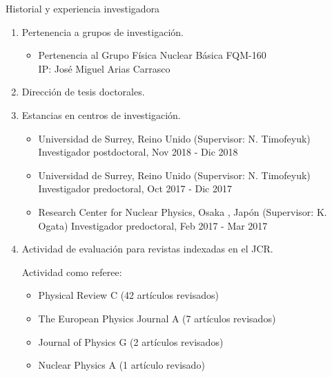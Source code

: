 \documentclass{resume2} %
\begin{document}
\begin{rSection}{Historial y experiencia investigadora}
\begin{enumerate}[label=\alph*.]
\item Pertenencia a grupos de investigación.

\begin{itemize}
\item Pertenencia al Grupo F\'isica Nuclear B\'asica FQM-160 \\
IP: Jos\'e Miguel Arias Carrasco
\end{itemize}

\item Direcci\'on de tesis doctorales.

\item Estancias en centros de investigaci\'on.

\begin{itemize}
\item  Universidad de Surrey, Reino Unido (Supervisor: N. Timofeyuk) \newline Investigador postdoctoral, Nov 2018 - Dic 2018 
\newline\quad{}

\item Universidad de Surrey, Reino Unido (Supervisor: N. Timofeyuk) \newline Investigador predoctoral, Oct 2017 - Dic 2017 
\newline\quad{}

\item  Research Center for Nuclear Physics, Osaka , Jap\'on (Supervisor: K. Ogata) \newline Investigador predoctoral, Feb 2017 - Mar 2017 
\newline\quad{}
\end{itemize}

\item  Actividad de evaluación para revistas indexadas en el JCR.

Actividad como referee:

\begin{itemize}
\item Physical Review C (42 art\'iculos revisados)

\item The European Physics Journal A (7 art\'iculos revisados)

\item Journal of Physics G (2 art\'iculos revisados)

\item Nuclear Physics A (1 art\'iculo revisado)


\end{itemize}
\end{enumerate}
\end{rSection}
\end{document}
